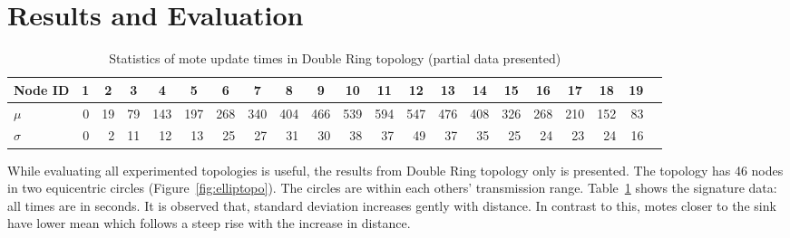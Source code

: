 \documentclass{CRPITStyle}
\newcommand*{\bd}[1]{\multicolumn{1}{|c|}{\bfseries #1}}
\begin{document}
\section{Results and Evaluation}
\label{sec:eval}

\begin{table}[t!]
\centering
\begin{tabular}{|l|*{19}{r|}r|}
\hline
\bd{Node ID}           & \bd{1} & \bd{2} & \bd{3} & \bd{4} & \bd{5} & \bd{6} & \bd{7} & \bd{8} & \bd{9} & \bd{10} & \bd{11} & \bd{12} & \bd{13} & \bd{14} & \bd{15} & \bd{16} & \bd{17} & \bd{18} & \bd{19} \\ %
\hline
$\mu$            & 0 &19 & 79& 143&197 &268&340&404&466&539 &594 &547 &476 &408 &326 & 268&210 & 152 & 83 \\ %
$\sigma$		 & 0 & 2 & 11 & 12 & 13 & 25& 27&31 &30 & 38 & 37 & 49 & 37 & 35 & 25  & 24 & 23 & 24 & 16 \\ %
\hline
\end{tabular}
\caption{Statistics of mote update times in Double Ring topology (partial data presented)}
\label{tab:stat_ellip}
\end{table}


While evaluating all experimented topologies is useful, the results from Double Ring topology only is presented. %
The topology has 46 nodes in two equicentric circles (Figure~\ref{fig:elliptopo}).
The circles are within each others' transmission range.
Table~\ref{tab:stat_ellip} shows the signature data: all times are in seconds.
It is observed that, standard deviation increases gently with distance.
In contrast to this, %
motes closer to the sink have lower mean which follows a steep rise with the increase in distance.
\end{document}
